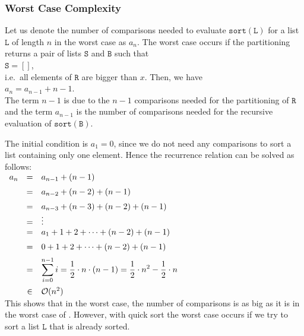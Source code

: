 \subsubsection{Worst Case Complexity}
Let us denote the number of comparisons needed to evaluate $\mathtt{sort}(\mathtt{L})$ for a list $\mathtt{L}$ of
length $n$ in the worst case as $a_n$.  The worst case occurs if the partitioning
returns a pair of lists $\mathtt{S}$ and $\mathtt{B}$ such that
\\[0.2cm]
\hspace*{1.3cm}
$\mathtt{S} = []$,
\\[0.2cm]
i.e.~all elements of $\mathtt{R}$ are bigger than $x$.  Then, we have
\\[0.2cm]
\hspace*{1.3cm}
$a_n = a_{n-1} + n - 1$. 
\\[0.2cm]
The term $n-1$ is due to the $n-1$ comparisons needed for the partitioning of $\mathtt{R}$
and the term $a_{n-1}$ is the number of comparisons needed for the recursive evaluation of $\mathtt{sort}(\mathtt{B})$.

The initial condition is $a_1 = 0$, since we do not need any comparisons to sort a list
containing only one element.
Hence the recurrence relation can be solved as follows:
\\[0.2cm]
\hspace*{1.3cm}
$
\begin{array}{lcl}
  a_n & = & a_{n-1} + (n-1) \\[0.2cm]
      & = & a_{n-2} + (n-2) + (n-1) \\[0.2cm]
      & = & a_{n-3} + (n-3) + (n-2) + (n-1) \\
      & = & \vdots \\
      & = & a_{1} + 1 + 2 + \cdots  + (n-2) + (n-1) \\[0.2cm]
      & = & 0 + 1 + 2 + \cdots  + (n-2) + (n-1) \\[0.2cm]
      & = & \displaystyle \sum\limits_{i=0}^{n-1} i  =  \frac{1}{2} \cdot n \cdot(n - 1) =
            \frac{1}{2} \cdot n^2 - \frac{1}{2} \cdot n \\[0.5cm]
      & \in & \mathcal{O}(n^2)
\end{array}
$
\\[0.2cm]
This shows that in the worst case, the number of comparisons is as big as it is in the worst case of 
.  However, with quick sort the worst case occurs if we try to sort a list $\mathtt{L}$ that is
already sorted. 


